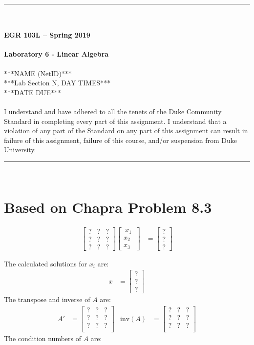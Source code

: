 \documentclass{article}
\begin{document}
\begin{center}
\rule{6.5in}{0.5mm}\\~\\
\textbf{\large EGR 103L -- Spring 2019}\\~\\
\textbf{\huge Laboratory 6 - Linear Algebra}\\~\\
***NAME (NetID)***\\
***Lab Section N, DAY TIMES***\\
***DATE DUE***\\~\\
{\small I understand and have adhered to all the tenets of the Duke
  Community Standard in completing every part of this assignment.  I
  understand that a violation of any part of the Standard on any part
  of this assignment can result in failure of this assignment, failure
  of this course, and/or suspension from Duke University.} 
\rule{6.5in}{0.5mm}\\
\end{center}
\tableofcontents
\listoffigures
\pagebreak
\section{Based on Chapra Problem 8.3}
\begin{align*}
\begin{bmatrix}
 ? & ? & ?\\
 ? & ? & ?\\
 ? & ? & ?
\end{bmatrix}
\begin{bmatrix}
~x_1~ \\ x_2 \\ x_3
\end{bmatrix}&=
\begin{bmatrix}
? \\ ? \\ ? 
\end{bmatrix}
\end{align*}

The calculated solutions for $x_i$ are:
\begin{align*}
x&=\begin{bmatrix}
  ?\\
  ?\\
  ?
\end{bmatrix}
\end{align*}
The transpose and inverse of $A$ are:
\begin{align*}
A' &=
\begin{bmatrix}
 ? & ? & ? \\
 ? & ? & ? \\
 ? & ? & ? \\
\end{bmatrix} &
\mbox{inv}(A) &= 
\begin{bmatrix}
 ? & ? & ? \\
 ? & ? & ? \\
 ? & ? & ? \\
\end{bmatrix}
\end{align*}
The condition numbers of $A$ are:
\end{document}

